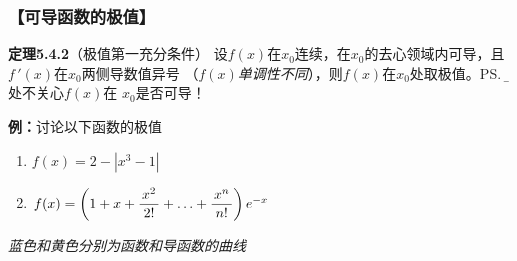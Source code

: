 \subsubsection{【可导函数的极值】}

{\bf 定理5.4.2}（极值第一充分条件）
设$f(x)$在$x_0$连续，在$x_0$的去心领域内可导，且$f\,'(x)$在$x_0$两侧导数值异号
（{\it $f(x)$单调性不同}），则$f(x)$在$x_0$处取极值。\ps{\b 此处不关心$f(x)$在
$x_0$是否可导！}

{\bf 例：}讨论以下函数的极值
\begin{enumerate}[(1)]
  \setlength{\itemindent}{1cm}
  \item $f(x)=2-|x^3-1|$
  \item $f(x)=\left(1+x+\displaystyle\frac{\,{x^2}\,}{\,{2!}\,}+\ldots+\displaystyle\frac{\,{x^n}\,}{\,{n!}\,}\right)e^{-x}$ 
\end{enumerate}

\begin{center}
	\quad
	
	{\it 蓝色和黄色分别为函数和导函数的曲线}
\end{center}

